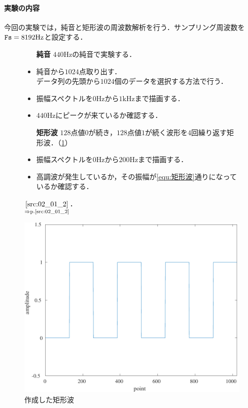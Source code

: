 \paragraph{実験の内容}今回の実験では，純音と矩形波の周波数解析を行う．サンプリング周波数を\(\textrm{\texttt{Fs}}=8192\textrm{Hz}\)と設定する．
\begin{figure}[H]
    \begin{minipage}[c]{.55\textwidth}
        \begin{itemize}
            \item[\textbf{純音}] \(440\textrm{Hz}\)の純音で実験する．
            \item 純音から\(1024\)点取り出す．\\
                  データ列の先頭から\(1024\)個のデータを選択する方法で行う．
            \item 振幅スペクトルを\(0\textrm{Hz}\)から\(1\textrm{kHz}\)まで描画する．
            \item \(440\textrm{Hz}\)にピークが来ているか確認する．
            \item[\textbf{矩形波}] \(128\)点値\(0\)が続き，\(128\)点値\(1\)が続く波形を\(4\)回繰り返す矩形波．（\ref{fig:作成した矩形波}）
            \item 振幅スペクトルを\(0\textrm{Hz}\)から\(200\textrm{Hz}\)まで描画する．
            \item 高調波が発生しているか，その振幅が\eqref{equ:矩形波}通りになっているか確認する．
        \end{itemize}
        \(\underset{\Rightarrow\textrm{p.\pageref{src:02_01_2}}}{\textrm{\ref{src:02_01_2}}}\)．
    \end{minipage}
    \begin{minipage}[c]{.4\textwidth}
        \centering
        \includegraphics[keepaspectratio,width=\textwidth]{../../Figures/02_021.pdf}
        \caption{作成した矩形波}
        \label{fig:作成した矩形波}
    \end{minipage}
\end{figure}
